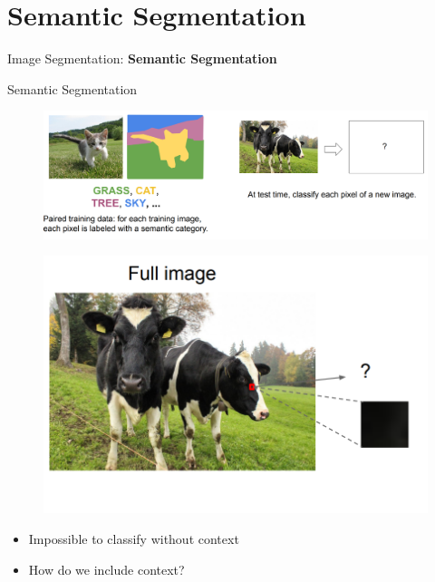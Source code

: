 \section{Semantic Segmentation}
\begin{frame}{}
    \LARGE Image Segmentation: \textbf{Semantic Segmentation}
\end{frame}

\begin{frame}[allowframebreaks]{Semantic Segmentation}
    \begin{figure}
        \centering
        \includegraphics[width=1.0\textwidth,height=1.0\textheight,keepaspectratio]{images/segmentation/sem_1.png}
    \end{figure}
    
\framebreak

    \begin{figure}
        \centering
        \includegraphics[width=1.0\textwidth,height=0.7\textheight,keepaspectratio]{images/segmentation/sem_2.png}
    \end{figure}
    \pause

    \begin{itemize}
        \item Impossible to classify without context
        \item How do we include context?
    \end{itemize}
\end{frame}


